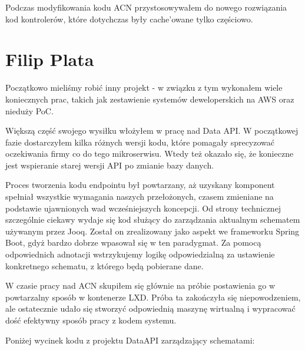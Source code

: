 \documentclass[licencjacka]{pracamgr}
\begin{document}
\vspace{1mm}

Podczas modyfikowania kodu ACN przystosowywałem do nowego rozwiązania kod kontrolerów, które dotychczas były cache'owane tylko częściowo.

\vspace{10mm}

\section{Filip Plata}

Początkowo mieliśmy robić inny projekt - w związku z tym wykonałem wiele koniecznych prac, takich jak zestawienie systemów deweloperskich na AWS oraz nieduży PoC.

Większą część swojego wysiłku włożyłem w pracę nad Data API. W początkowej fazie dostarczyłem kilka różnych wersji kodu, które pomagały sprecyzować oczekiwania firmy co do tego mikroserwisu. Wtedy też okazało się, że konieczne jest wspieranie starej wersji API po zmianie bazy danych.

Proces tworzenia kodu endpointu był powtarzany, aż uzyskany komponent spełniał wszystkie wymagania naszych przełożonych, czasem zmieniane na podstawie ujawnionych wad wcześniejszych koncepcji. Od strony technicznej szczególnie ciekawy wydaje się kod służący do zarządzania aktualnym schematem używanym przez Jooq. Został on zrealizowany jako aspekt we frameworku Spring Boot, gdyż bardzo dobrze wpasował się w ten paradygmat. Za pomocą odpowiednich adnotacji wstrzykujemy logikę odpowiedzialną za ustawienie konkretnego schematu, z którego będą pobierane dane.

\vspace{1mm}

W czasie pracy nad ACN skupiłem się głównie na próbie postawienia go w powtarzalny sposób w kontenerze LXD. Próba ta zakończyła się niepowodzeniem, ale ostatecznie udało się stworzyć odpowiednią maszynę wirtualną i wypracować dość efektywny sposób pracy z kodem systemu.

\newpage
Poniżej wycinek kodu z projektu DataAPI zarządzający schematami:
\end{document}

